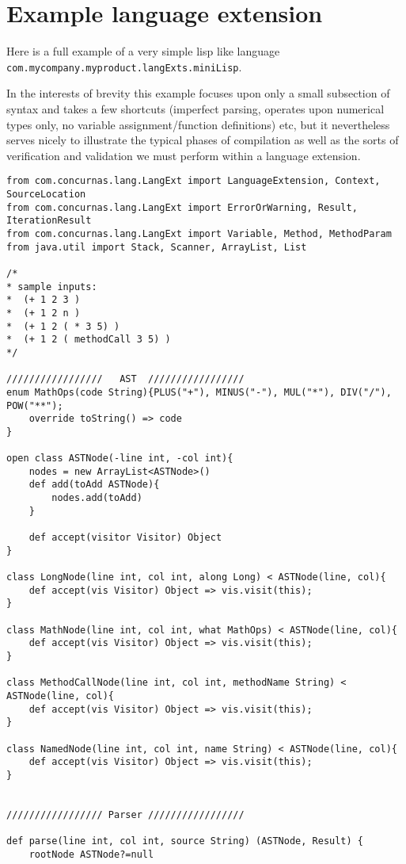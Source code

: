 \documentclass[conc-doc]{subfiles}
\begin{document}
\section{Example language extension}
Here is a full example of a very simple lisp like language \lstinline{com.mycompany.myproduct.langExts.miniLisp}.

In the interests of brevity this example focuses upon only a small subsection of syntax and takes a few shortcuts (imperfect parsing, operates upon numerical types only, no variable assignment/function definitions) etc, but it nevertheless serves nicely to illustrate the typical phases of compilation as well as the sorts of verification and validation we must perform within a language extension.

\begin{lstlisting}
from com.concurnas.lang.LangExt import LanguageExtension, Context, SourceLocation
from com.concurnas.lang.LangExt import ErrorOrWarning, Result, IterationResult
from com.concurnas.lang.LangExt import Variable, Method, MethodParam
from java.util import Stack, Scanner, ArrayList, List

/*
* sample inputs:
*  (+ 1 2 3 )
*  (+ 1 2 n )
*  (+ 1 2 ( * 3 5) )
*  (+ 1 2 ( methodCall 3 5) )
*/

/////////////////   AST  /////////////////
enum MathOps(code String){PLUS("+"), MINUS("-"), MUL("*"), DIV("/"), POW("**");
	override toString() => code
}

open class ASTNode(-line int, -col int){
	nodes = new ArrayList<ASTNode>()
	def add(toAdd ASTNode){
		nodes.add(toAdd)
	}
	
	def accept(visitor Visitor) Object 
}

class LongNode(line int, col int, along Long) < ASTNode(line, col){
	def accept(vis Visitor) Object => vis.visit(this);
}

class MathNode(line int, col int, what MathOps) < ASTNode(line, col){
	def accept(vis Visitor) Object => vis.visit(this);
}

class MethodCallNode(line int, col int, methodName String) < ASTNode(line, col){
	def accept(vis Visitor) Object => vis.visit(this);
}

class NamedNode(line int, col int, name String) < ASTNode(line, col){
	def accept(vis Visitor) Object => vis.visit(this);
}


///////////////// Parser /////////////////

def parse(line int, col int, source String) (ASTNode, Result) {
	rootNode ASTNode?=null
	

\end{lstlisting}
\end{document}
